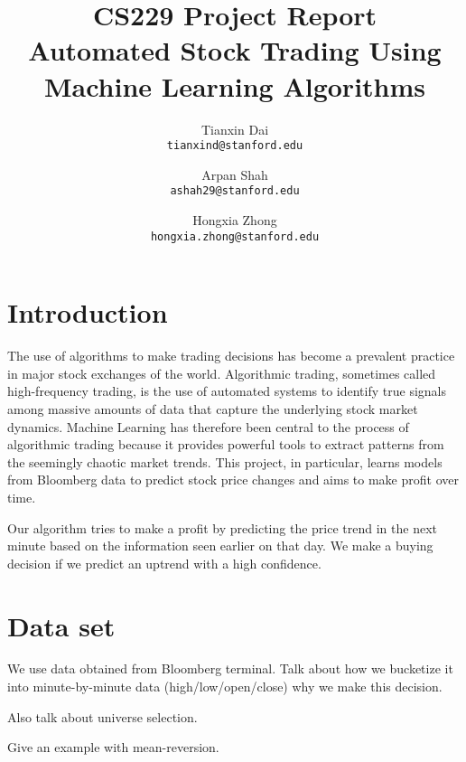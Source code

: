 \documentclass[10pt,twocolumn,letterpaper]{article}
\begin{document}
\title{CS229 Project Report \\
Automated Stock Trading Using Machine Learning Algorithms}

\author{Tianxin Dai\\
{\tt\small tianxind@stanford.edu}
\and
Arpan Shah\\
{\tt\small ashah29@stanford.edu}
\and
Hongxia Zhong\\
{\tt\small hongxia.zhong@stanford.edu}
}

\maketitle
\thispagestyle{empty}

\section{Introduction}
The use of algorithms to make trading decisions has become a prevalent practice in major stock exchanges
of the world. Algorithmic trading, sometimes called high-frequency trading, is
the use of automated systems to identify true signals among massive amounts of data that capture the underlying stock market dynamics. Machine Learning has therefore been central to the process of algorithmic trading because it provides powerful tools to extract patterns from the seemingly chaotic market trends. This project, in particular, learns models from Bloomberg data to predict stock price changes and aims to make profit over time.

Our algorithm tries to make a profit by predicting the price trend in the next minute based on the information seen earlier on that
day. We make a buying decision if we predict an uptrend with a high confidence.  

\section{Data set}
We use data obtained from Bloomberg terminal.
Talk about how we bucketize it into minute-by-minute data (high/low/open/close) why we make this decision.

Also talk about universe selection.

Give an example with mean-reversion.
\end{document}
